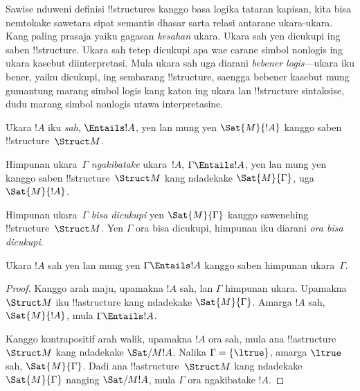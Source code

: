 \documentclass[../../../include/open-logic-section]{subfiles}
\begin{document}

\begin{explain}
Sawise nduweni definisi !!{structure}s kanggo basa logika tataran
kapisan, kita bisa nemtokake sawetara sipat semantis dhasar
sarta relasi antarane ukara-ukara. Kang paling prasaja yaiku
gagasan \emph{kesahan} ukara. Ukara sah yen dicukupi
ing saben !!{structure}. Ukara sah tetep dicukupi apa wae
carane simbol nonlogis ing ukara kasebut diinterpretasi.
Mula ukara sah uga diarani \emph{bebener logis}---ukara iku
bener, yaiku dicukupi, ing sembarang !!{structure}, saengga
bebener kasebut mung gumantung marang simbol logis kang
katon ing ukara lan !!{structure} sintaksise, dudu marang
simbol nonlogis utawa interpretasine.
\end{explain}

\begin{defn}[Kesahan]
Ukara $!A$ iku \emph{sah}, $\Entails !A$, yen lan mung yen
$\Sat{M}{!A}$ kanggo saben !!{structure}~$\Struct M$.
\end{defn}

\begin{defn}
Himpunan ukara~$\Gamma$ \emph{ngakibatake} ukara~$!A$,
$\Gamma \Entails !A$, yen lan mung yen kanggo saben
!!{structure}~$\Struct M$ kang ndadekake $\Sat{M}{\Gamma}$,
uga $\Sat{M}{!A}$.
\end{defn}


\begin{defn}
Himpunan ukara~$\Gamma$ \emph{bisa dicukupi} yen
$\Sat{M}{\Gamma}$ kanggo sawenehing !!{structure}~$\Struct M$.
Yen $\Gamma$ ora bisa dicukupi, himpunan iku diarani
\emph{ora bisa dicukupi}.
\end{defn}

\begin{prop}
Ukara $!A$ sah yen lan mung yen $\Gamma \Entails !A$
kanggo saben himpunan ukara~$\Gamma$.
\end{prop}

\begin{proof}
Kanggo arah maju, upamakna $!A$ sah, lan
$\Gamma$ himpunan ukara. Upamakna $\Struct M$ iku
!!a{structure} kang ndadekake $\Sat{M}{\Gamma}$.
Amarga $!A$ sah, $\Sat{M}{!A}$, mula
$\Gamma \Entails !A$.

Kanggo kontrapositif arah walik, upamakna $!A$ ora sah,
mula ana !!a{structure}~$\Struct M$ kang ndadekake
$\Sat/{M}{!A}$. Nalika $\Gamma = \{ \ltrue \}$,
amarga $\ltrue$ sah, $\Sat{M}{\Gamma}$.
Dadi ana !!a{structure}~$\Struct M$ kang ndadekake
$\Sat{M}{\Gamma}$ nanging $\Sat/{M}{!A}$,
mula $\Gamma$ ora ngakibatake $!A$.
\end{proof}
\end{document}
